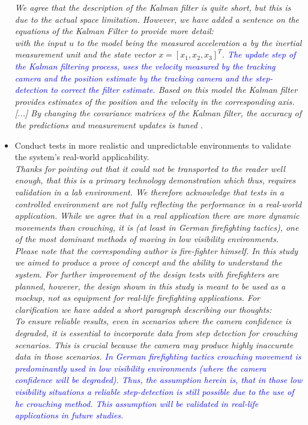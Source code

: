 \documentclass{article}
\begin{document}
\begin{itemize}
\textit{We agree that the description of the Kalman filter is quite short, but this is due to the actual space limitation. However, we have added a sentence on the equations of the Kalman Filter to provide more detail:}\\

\textit{with the input $u$ to the model being the measured acceleration $a$ by the inertial measurement unit and the state vector $x = [x_1, x_2, x_3]^T$. \textcolor{blue}{The update step of the Kalman filtering process, uses the velocity measured by the tracking camera and the position estimate by the tracking camera and the step-detection to correct the filter estimate.} Based on this model the Kalman filter provides estimates of the position and the velocity in the corresponding axis. 
[...]
By changing the covariance matrices of the Kalman filter, the accuracy of the predictions and measurement updates is tuned \cite{welch2006}.}

\item Conduct tests in more realistic and unpredictable environments to validate the system's real-world applicability.\\
\textit{Thanks for pointing out that it could not be transported to the reader well enough, that this is  a primary technology demonstration which thus, requires validation in a lab environment. We therefore acknowledge that tests in a controlled environment are not fully reflecting the performance in a real-world application. While we agree that in a real application there are more dynamic movements than crouching, it is (at least in German firefighting tactics), one of the most dominant methods of moving in low visibility environments. Please note that the corresponding author is fire-fighter himself.  In this study we aimed to produce a prove of concept and the ability to understand the system. For further improvement of the design tests with firefighters are planned, however, the design shown in this study is meant to be used as a mockup, not as equipment for real-life firefighting applications. For clarification we have added a short paragraph describing our thoughts:}\\


\textit{To ensure reliable results, even in scenarios where the camera confidence is degraded, it is essential to incorporate data from step detection for crouching scenarios. This is crucial because the camera  may produce highly inaccurate data in those scenarios. \textcolor{blue}{In German firefighting tactics crouching movement is predominantly used in low visibility environments (where the camera confidence will be degraded). Thus, the assumption herein is, that in those low visibility situations a reliable step-detection is still possible due to the use of he crouching method. This assumption will be validated in real-life applications in future studies.}}


\end{itemize}
\end{document}
